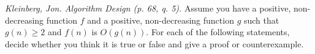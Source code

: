 \documentclass[solutionorbox,answers]{exam}
\begin{document}
\begin{questions}

\pagebreak

  \question \textit{Kleinberg, Jon. Algorithm Design (p. 68, q. 5).} Assume you have a positive, non-decreasing function $f$ and a positive, non-decreasing function $g$ such that $g(n) \geq 2$ and $f(n)$ is $O(g(n))$. For each of the following statements, decide whether you think it is true or false and give a proof or counterexample.

\end{questions}
\end{document}
